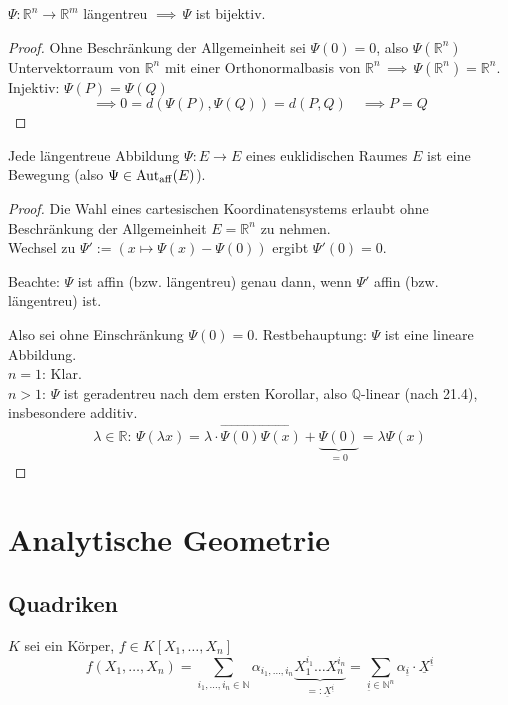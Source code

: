 \documentclass[parskip,a4paper,twoside,DIV15,BCOR12mm]{scrbook}
\begin{document}
\begin{corollary}
\(\Psi:\mathbb{R}^{n}\to\mathbb{R}^{m}\) längentreu \(\implies\,\Psi\) ist 
bijektiv.
\end{corollary}
\begin{proof}
Ohne Beschränkung der Allgemeinheit sei \(\Psi(0)=0\), also 
\(\Psi(\mathbb{R}^{n})\) Untervektorraum von \(\mathbb{R}^{n}\) mit einer 
Orthonormalbasis von \(\mathbb{R}^{n}\,\implies\,\Psi(\mathbb{R}^{n})=\mathbb{R}^{n}\).\\
Injektiv: \(\Psi(P)=\Psi(Q)\)
\[
\implies 0=d(\Psi(P),\Psi(Q))=d(P,Q)\quad\implies P=Q
\]
\end{proof}

\begin{theo}
\label{Satz 22.3}
Jede längentreue Abbildung \(\Psi:E\to E\) eines euklidischen Raumes \(E\) ist
eine Bewegung (also \(\Psi\in\operatorname{Aut_{aff}}(E)\)).
\end{theo}
\begin{proof}
Die Wahl eines cartesischen Koordinatensystems erlaubt ohne Beschränkung der
Allgemeinheit \(E=\mathbb{R}^{n}\) zu nehmen.\\
Wechsel zu \(\Psi':=(x\mapsto\Psi(x)-\Psi(0))\) ergibt \(\Psi'(0)=0\).

Beachte: \(\Psi\) ist affin (bzw. längentreu) genau dann, wenn \(\Psi'\) affin
(bzw. längentreu) ist.

Also sei ohne Einschränkung \(\Psi(0)=0\). Restbehauptung: \(\Psi\) ist eine
lineare Abbildung.\\
\(n=1\): Klar.\\
\(n>1\): \(\Psi\) ist geradentreu nach dem ersten Korollar, also 
\(\mathbb{Q}\)-linear (nach 21.4), insbesondere additiv. 
\[
\lambda\in\mathbb{R}:\,\Psi(\lambda x)=\lambda\cdot\overrightarrow{\Psi(0)\Psi(x)}+\underbrace{\Psi(0)}_{=0}=\lambda\Psi(x)
\]
\end{proof}

\chapter{Analytische Geometrie}
\section{Quadriken}

\(K\) sei ein Körper, \(f\in K[X_{1},\ldots,X_{n}]\)
\[
f(X_{1},\ldots,X_{n})=\sum_{i_{1},\ldots,i_{n}\in\mathbb{N}}{\alpha_{i_{1},\ldots,i_{n}}\underbrace{X_{1}^{i_{1}}\ldots X_{n}^{i_{n}}}_{=:\underline{X}^{\underline{i}}}}=
\sum_{\underline{i}\in\mathbb{N}^{n}}{\alpha_{\underline{i}}\cdot\underline{X}^{\underline{i}}}
\]
\end{document}
